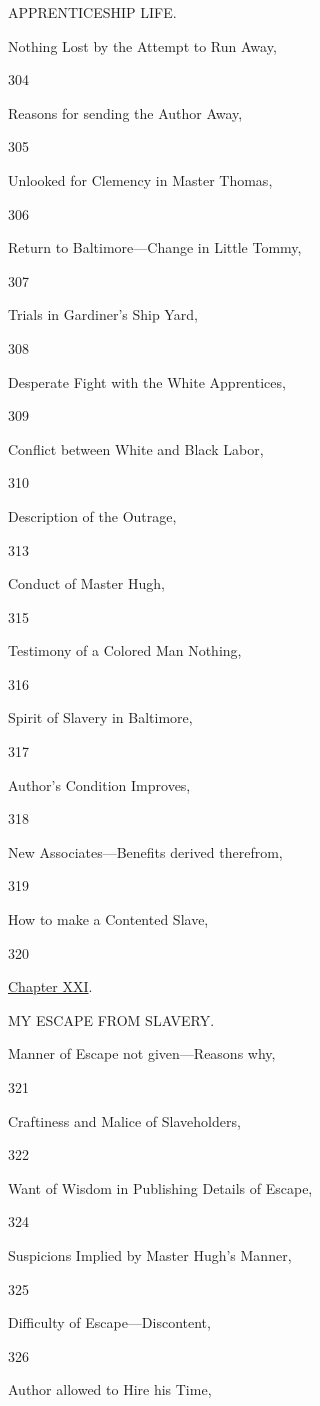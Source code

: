 APPRENTICESHIP LIFE.

Nothing Lost by the Attempt to Run Away,

304

Reasons for sending the Author Away,

305

Unlooked for Clemency in Master Thomas,

306

Return to Baltimore---Change in Little Tommy,

307

Trials in Gardiner's Ship Yard,

308

Desperate Fight with the White Apprentices,

309

Conflict between White and Black Labor,

310

Description of the Outrage,

313

Conduct of Master Hugh,

315

Testimony of a Colored Man Nothing,

316

Spirit of Slavery in Baltimore,

317

Author's Condition Improves,

318

New Associates---Benefits derived therefrom,

319

How to make a Contented Slave,

320

\href{/wiki/My_Bondage_and_My_Freedom_(1855)/Chapter_XXI}{Chapter XXI}.

MY ESCAPE FROM SLAVERY.

Manner of Escape not given---Reasons why,

321

Craftiness and Malice of Slaveholders,

322

Want of Wisdom in Publishing Details of Escape,

324

Suspicions Implied by Master Hugh's Manner,

325

Difficulty of Escape---Discontent,

326

Author allowed to Hire his Time,

